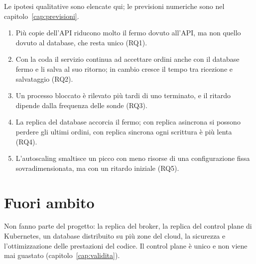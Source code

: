 Le ipotesi qualitative sono elencate qui; le previsioni numeriche sono nel capitolo~\ref{cap:previsioni}.

\begin{enumerate}[label=\textbf{H\arabic*}]
  \item Più copie dell'API riducono molto il fermo dovuto all'API, ma non quello dovuto al database, che resta unico (RQ1).
  \item Con la coda il servizio continua ad accettare ordini anche con il database fermo e li salva al suo ritorno; in cambio cresce il tempo tra ricezione e salvataggio (RQ2).
  \item Un processo bloccato è rilevato più tardi di uno terminato, e il ritardo dipende dalla frequenza delle sonde (RQ3).
  \item La replica del database accorcia il fermo; con replica asincrona si possono perdere gli ultimi ordini, con replica sincrona ogni scrittura è più lenta (RQ4).
  \item L'autoscaling smaltisce un picco con meno risorse di una configurazione fissa sovradimensionata, ma con un ritardo iniziale (RQ5).
\end{enumerate}

\section{Fuori ambito}

Non fanno parte del progetto: la replica del broker, la replica del control plane di Kubernetes, un database distribuito su più zone del cloud, la sicurezza e l'ottimizzazione delle prestazioni del codice. Il control plane è unico e non viene mai guastato (capitolo~\ref{cap:validita}).
